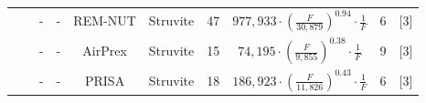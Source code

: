 \documentclass[authoryear]{elsarticle}
\begin{document}
\begin{table}
{\begin{threeparttable}
\begin{tabular}{@{}cccccccccc@{}}
				&                                                                                                                                                         & -                                                                               & -                                     & REM-NUT                                                                                  & Struvite                                                                          & 47                                                                                    & $977,933 \cdot \left( \frac{F}{30,879} \right)^{0.94} \cdot \frac{1}{F}$                                 & 6                                                            &   [3]       \\
				&                                                                                                                                                         & -                                                                               & -                                     & AirPrex                                                                                  & Struvite                                                                          & 15                                                                                    & $74,195 \cdot \left( \frac{F}{9,855} \right)^{0.38} \cdot \frac{1}{F}$                                  & 9                                                            &     [3]     \\
				&                                                                                                                                                         & -                                                                               & -                                     & PRISA                                                                                    & Struvite                                                                          & 18                                                                                    & $186,923 \cdot \left( \frac{F}{11,826} \right)^{0.43} \cdot \frac{1}{F}$                                  & 6                                                            &     [3]     \\ \cmidrule(l){2-10}

\end{tabular}
\end{threeparttable}}
\end{table}
\end{document}

